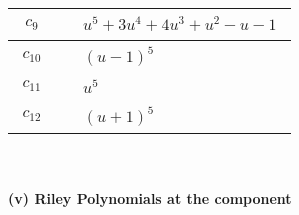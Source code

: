 \documentclass[1p]{elsarticle_modified}
\theoremstyle{definition}
\begin{document}
\begin{tabular}{m{50pt}|m{274pt}}
\hline $$\begin{aligned}c_{9}\end{aligned}$$&$\begin{aligned}
&u^5+3 u^4+4 u^3+u^2- u-1
\end{aligned}$\\
\hline $$\begin{aligned}c_{10}\end{aligned}$$&$\begin{aligned}
&(u-1)^5
\end{aligned}$\\
\hline $$\begin{aligned}c_{11}\end{aligned}$$&$\begin{aligned}
&u^5
\end{aligned}$\\
\hline $$\begin{aligned}c_{12}\end{aligned}$$&$\begin{aligned}
&(u+1)^5
\end{aligned}$\\
\hline
\end{tabular}\\~\\
\newpage\renewcommand{\arraystretch}{1}
\flushleft \textbf{(v) Riley Polynomials at the component}\newline \\
\end{document}
